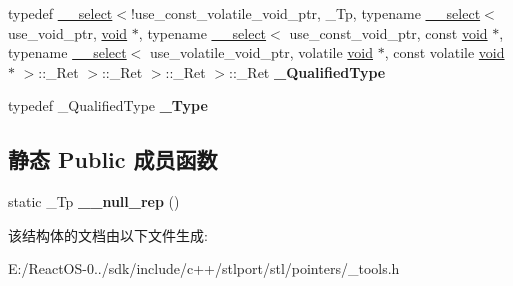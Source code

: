\begin{DoxyCompactItemize}
typedef \hyperlink{struct____select}{\+\_\+\+\_\+select}$<$!use\+\_\+const\+\_\+volatile\+\_\+void\+\_\+ptr, \+\_\+\+Tp, typename \hyperlink{struct____select}{\+\_\+\+\_\+select}$<$ use\+\_\+void\+\_\+ptr, \hyperlink{interfacevoid}{void} $\ast$, typename \hyperlink{struct____select}{\+\_\+\+\_\+select}$<$ use\+\_\+const\+\_\+void\+\_\+ptr, const \hyperlink{interfacevoid}{void} $\ast$, typename \hyperlink{struct____select}{\+\_\+\+\_\+select}$<$ use\+\_\+volatile\+\_\+void\+\_\+ptr, volatile \hyperlink{interfacevoid}{void} $\ast$, const volatile \hyperlink{interfacevoid}{void} $\ast$ $>$\+::\+\_\+\+Ret $>$\+::\+\_\+\+Ret $>$\+::\+\_\+\+Ret $>$\+::\+\_\+\+Ret {\bfseries \+\_\+\+Qualified\+Type}
\item 
\mbox{\label{struct___storage_type_a64522f9113eaa9cc3b1672971807e201}} 
typedef \+\_\+\+Qualified\+Type {\bfseries \+\_\+\+Type}
\end{DoxyCompactItemize}
\subsection*{静态 Public 成员函数}
\begin{DoxyCompactItemize}
\item 
\mbox{\label{struct___storage_type_a4463d383083566b98681633089ea9cbc}} 
static \+\_\+\+Tp {\bfseries \+\_\+\+\_\+null\+\_\+rep} ()
\end{DoxyCompactItemize}


该结构体的文档由以下文件生成\+:\begin{DoxyCompactItemize}
\item 
E\+:/\+React\+O\+S-\/0../sdk/include/c++/stlport/stl/pointers/\+\_\+tools.\+h\end{DoxyCompactItemize}
